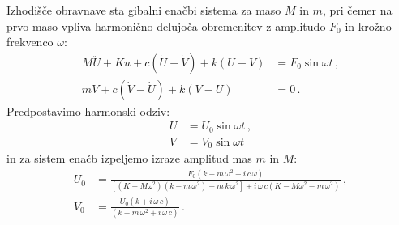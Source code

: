         \newpage
        Izhodišče obravnave sta gibalni enačbi sistema za maso $M$ in $m$, pri čemer na prvo maso vpliva harmonično delujoča obremenitev z amplitudo $F_0$ in krožno frekvenco $\omega$:
        \begin{align}
            M \ddot U +K u + c (\dot U - \dot V) + k (U-V)  &= F_0 \sin\omega t \nonumber \,, \\
            m \ddot V + c (\dot V - \dot U) + k(V-U) &= 0 \, .
        \end{align}
        Predpostavimo harmonski odziv:
        \begin{align}
            U  &= U_0 \sin\omega t \nonumber \,,\\
            V  &= V_0 \sin\omega t
        \end{align}
        in za sistem enačb izpeljemo izraze amplitud mas $m$ in $M$:
        \begin{align}
            U_0&=\frac{F_0\left(k-m \, \omega^2+i \, c \, \omega\right)}{\left[\left(K-M \omega^2\right)\left(k-m \, \omega^2\right)-m \, k \, \omega^2\right]+i \, \omega \, c\left(K-M \omega^2-m \, \omega^2\right)}  \label{eq:X1_amplituda} \,,\\
            V_0&=\frac{U_0\left(k+i \, \omega \, c\right)}{\left(k-m \, \omega^2+ i \, \omega \, c\right)} \label{eq:X2_amplituda} \,.
        \end{align}
        
